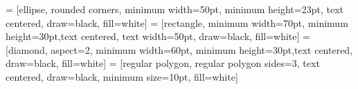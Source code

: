 \documentclass[12pt,a4paper]{report}
\begin{document}
 = [ellipse, rounded corners, minimum width=50pt, minimum height=23pt, text centered, draw=black, fill=white]
 = [rectangle, minimum width=70pt, minimum height=30pt,text centered, text width=50pt, draw=black, fill=white]
 = [diamond, aspect=2, minimum width=60pt, minimum height=30pt,text centered, draw=black, fill=white]
 = [regular polygon, regular polygon sides=3, text centered, draw=black, minimum size=10pt, fill=white]
\newcommand{\tnode}[5]{
  \node (#1) [#2, xshift=#4-0pt, yshift=#5-0pt] {\scriptsize #3};
}
\newcommand{\tnanode}[7]{
  \node (#1) [#2, xshift=#4-0pt, yshift=#5-0pt, #6 of= #7] {\scriptsize #3};
}
\newcommand{\tline}[3]{
  \draw [#3] (#1) -- (#2);
}
\newenvironment*{mypara}%
{\noindent\ignorespaces}%
{\par\noindent%
  \ignorespacesafterend}
\end{document}
